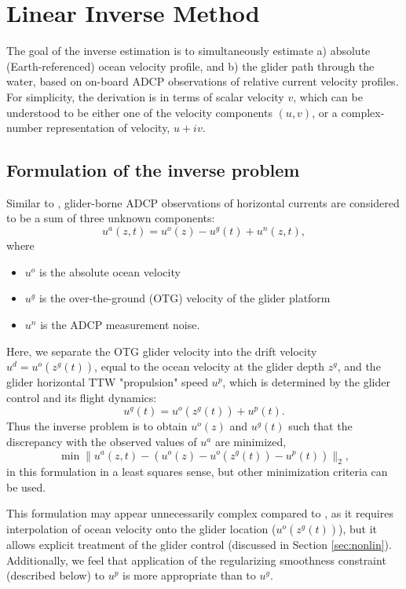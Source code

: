 \section{Linear Inverse Method}

The goal of the inverse estimation is to simultaneously estimate a) absolute (Earth-referenced) ocean velocity profile, and b) the glider path through the water, based on on-board ADCP observations of relative current velocity profiles.
For simplicity, the derivation is in terms of scalar velocity $v$, which can be understood to be either one of the velocity components $(u,v)$, or a complex-number representation of velocity, $u+iv$.

\subsection {Formulation of the inverse problem}
Similar to \cite{Visbeck2002,todd-2011-JGRC}, glider-borne ADCP observations of horizontal currents are considered to be a sum of three unknown components: 
$$u^a(z,t)=u^o(z)-u^g(t)+u^n(z,t),$$
where 
\begin{itemize}
\item $u^o$ is the absolute ocean velocity 
\item $u^g$ is the over-the-ground (OTG) velocity of the glider platform 
\item $u^n$ is the ADCP measurement noise. 
\end{itemize}
Here, we separate the OTG glider velocity into the drift velocity $u^d=u^o(z^g(t))$, equal to the ocean velocity at the glider depth $z^g$, and the glider horizontal TTW "propulsion" speed $u^p$, which is determined by the glider control and its flight dynamics:
\[
u^g(t) = u^o(z^g(t)) + u^p(t).
\]
Thus the inverse problem is to obtain $u^o(z)$ and $u^g(t)$ such that the discrepancy with the observed values of $u^a$ are minimized,
\begin{equation}
\label{eq:min}
\min{\|u^a(z,t)-(u^o(z)-u^o(z^g(t))-u^p(t))\|_2},
\end{equation}
in this formulation in a least squares sense, but other minimization criteria can be used.

This formulation may appear unnecessarily complex compared to \cite{todd-2011-JGRC}, as it requires interpolation of ocean velocity onto the glider location ($u^o(z^g(t))$), but it allows explicit treatment of the glider control (discussed in Section \ref{sec:nonlin}). Additionally, we feel that application of the regularizing smoothness constraint (described below) to $u^p$ is more appropriate than to $u^g$.

